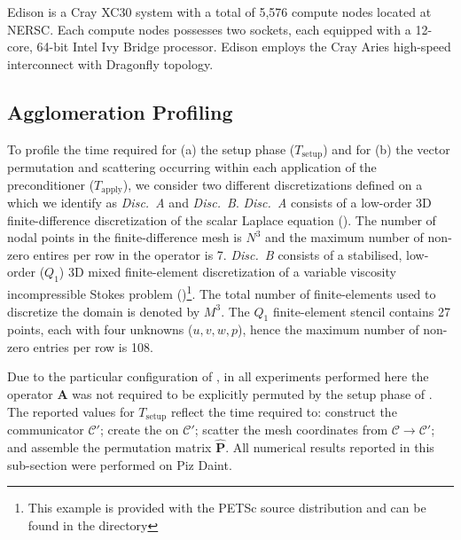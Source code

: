 \documentclass[]{siamart0216}
\newcommand{\dmat}[1]{\mathbf{#1}}
\begin{document}
Edison is a Cray XC30 system with a total of 5,576 compute nodes located at NERSC. 
Each compute nodes possesses two sockets, each equipped with a 12-core, 
64-bit Intel Ivy Bridge processor. 
Edison employs the Cray Aries high-speed interconnect with Dragonfly topology. 

\subsection{Agglomeration Profiling}




To profile the time required for (a) the setup phase ($T_\text{setup}$) and 
for (b) the vector permutation and scattering occurring within each application 
of the  preconditioner ($T_\text{apply}$), we consider two different discretizations defined on a  which we identify 
as \emph{Disc.~A} and \emph{Disc.~B}. 
\emph{Disc.~A} consists of a low-order 3D finite-difference discretization of the scalar Laplace equation ().
The number of nodal points in the finite-difference mesh is $N^3$ and
the maximum number of non-zero entires per row in the operator is 7.
\emph{Disc.~B} consists of a stabilised, low-order ($Q_1$) 3D mixed finite-element discretization of a variable 
viscosity incompressible Stokes problem ()\footnote{This example is provided with the PETSc source distribution and can be found  in the directory }. 
The total number of finite-elements used to discretize the domain is denoted by $M^3$. 
The $Q_1$ finite-element stencil contains 27 points, each with four unknowns ($u,v,w,p$), 
hence the maximum number of non-zero entries per row is 108.

Due to the particular configuration of , in all experiments performed here the 
operator $\dmat A$ was not required to be explicitly permuted by the setup phase of .
The reported values for $T_\text{setup}$ reflect the time required to: construct the communicator $\mathcal C'$;
create the  on $\mathcal C'$; scatter the mesh coordinates from $\mathcal C \rightarrow \mathcal C'$; and 
assemble the permutation matrix $\hat{\dmat P}$.
All numerical results reported in this sub-section were performed on Piz Daint.
\end{document}
